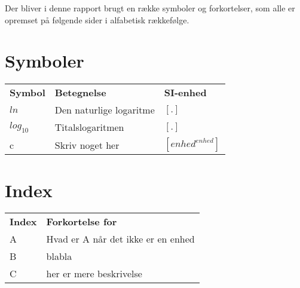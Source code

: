 
Der bliver i denne rapport brugt en række symboler og forkortelser, som alle er opremset på følgende sider i alfabetisk rækkefølge.
 
\section*{Symboler}
\begin{table}[h!]
    	\begin{tabular}{p{}|p{}|p{}}
           	\textbf{Symbol}&\textbf{Betegnelse}&\textbf{SI-enhed}
           	\\         	
           	$ln$& Den naturlige logaritme &$[.]$
           	\\
           	$log_{10}$& Titalslogaritmen&$[.]$
           	\\
           	c&Skriv noget her &$[enhed^{enhed}]$
           	\\         	
    	\end{tabular}
\end{table}
\newpage
 
\section*{Index}
\begin{table}[h!]
    	\begin{tabular}{p{}|p{}}
           	\textbf{Index}&\textbf{Forkortelse for}           	
           	\\
           	A&Hvad er A når det ikke er en enhed
           	\\
           	B& blabla
           	\\
           	C& her er mere beskrivelse        	
    	\end{tabular}
\end{table}
\newpage
 
